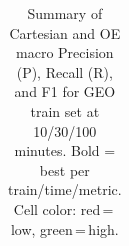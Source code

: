 \begin{table}[t]
{\begin{tabular}{l ccc ccc ccc ccc ccc ccc}
\bottomrule
\end{tabular}%
}
\caption{Summary of Cartesian and OE macro Precision (P), Recall (R), and F1 for GEO train set at 10/30/100 minutes. Bold = best per train/time/metric. Cell color: red\,=\,low, green\,=\,high.}
\label{tab:class_geo_feat}
\end{table}

